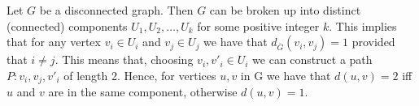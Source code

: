 Let $G$ be a disconnected graph. Then $G$ can be broken up into distinct (connected) components $U_1, U_2, \dots ,U_k$ for some positive integer $k$. This implies that for any vertex $v_i \in U_i$ and $v_j \in U_j$ we have that $d_{\bar{G}}\left(v_i, v_j\right) = 1$ provided that $ i \neq j$. This means that, choosing $v_i , v'_i \in U_i$ we can construct a path $P: v_i, v_j, v'_i$ of length 2. Hence, for vertices $u,v$ in G we have that $d\left(u,v\right) = 2$ iff $u$ and $v$ are in the same component, otherwise $d\left(u,v\right) = 1$.
